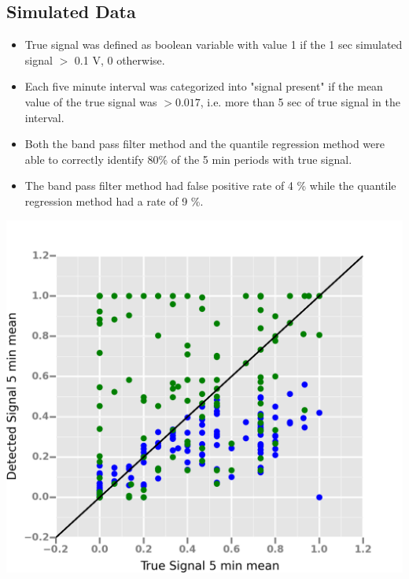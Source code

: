 \documentclass[a0, landscape]{a0poster}
\begin{document}
\begin{multicols}{3}
\subsection*{Simulated Data} 
\begin{minipage}{.14\textwidth}
	\begin{itemize}			
	\item True signal was defined as boolean variable with value 1 if the 1 sec simulated signal $>$ 0.1 V, 0 otherwise.
	\item Each five minute interval was categorized into "signal present" if the mean value of the true signal was $> 0.017$, i.e. more than 5 sec of true signal in the interval. 
	\item Both the band pass filter method and the quantile regression method were able to correctly identify 80\% of the 5 min periods with true signal.
	\item The band pass filter method had false positive rate of 4 \% while the quantile regression method had a rate of 9 \%.   
	\end{itemize}
\end{minipage}
\hfill
\begin{minipage}{.14\textwidth}
	\begin{center}			
		\includegraphics[width=\linewidth]{TrueVDetect}
	\end{center}
\end{minipage}

\end{multicols}
\end{document}
